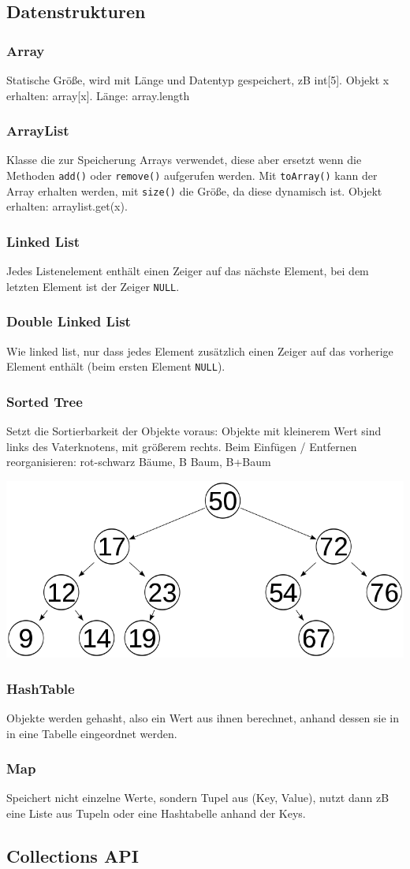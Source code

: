 \documentclass[12pt,a4]{article}
\begin{document}
	\subsection{Datenstrukturen}
	\subsubsection{Array}
	Statische Größe, wird mit Länge und Datentyp gespeichert, zB int[5]. Objekt x erhalten: array[x]. Länge: array.length
	\subsubsection{ArrayList}
	Klasse die zur Speicherung Arrays verwendet, diese aber ersetzt wenn die Methoden \texttt{add()} oder \texttt{remove()} aufgerufen werden. Mit \texttt{toArray()} kann der Array erhalten werden, mit \texttt{size()} die Größe, da diese dynamisch ist. Objekt erhalten: arraylist.get(x).
	\subsubsection{Linked List}
	Jedes Listenelement enthält einen Zeiger auf das nächste Element, bei dem letzten Element ist der Zeiger \texttt{NULL}.
	\subsubsection{Double Linked List}
	Wie linked list, nur dass jedes Element zusätzlich einen Zeiger auf das vorherige Element enthält (beim ersten Element \texttt{NULL}).
	\subsubsection{Sorted Tree}
	Setzt die Sortierbarkeit der Objekte voraus: Objekte mit kleinerem Wert sind links des Vaterknotens, mit größerem rechts. Beim Einfügen / Entfernen reorganisieren: rot-schwarz Bäume, B Baum, B+Baum
	\begin{center}
		\includegraphics[width=0.5\linewidth]{images/sortedtree}
	\end{center}
	\subsubsection{HashTable}
	Objekte werden gehasht, also ein Wert aus ihnen berechnet, anhand dessen sie in in eine Tabelle eingeordnet werden.
	\subsubsection{Map}
	Speichert nicht einzelne Werte, sondern Tupel aus (Key, Value), nutzt dann zB eine Liste aus Tupeln oder eine Hashtabelle anhand der Keys.
	
	\subsection{Collections API}
	
	
	
	
	
	
	
	
	
	
\end{document}
